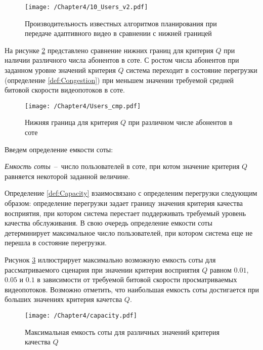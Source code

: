 \begin{figure}[htbp]
\begin{center}
\texttt{[image: /Chapter4/10\_Users\_v2.pdf]}
\caption{Производительность известных алгоритмов планирования при передаче адаптивного видео в сравнении с нижней границей}
\label{fig:Q_PLOT}
\end{center}
\end{figure}

На рисунке \ref{fig:Users_cmp} представлено сравнение нижних границ для критерия $Q$ при наличии различного числа абонентов в соте. С ростом числа абонентов при заданном уровне значений критерия $Q$ система переходит в состояние перегрузки (определение \ref{def:Congestion}) при меньшем значении требуемой средней битовой скорости видеопотоков в соте.

\begin{figure}[htbp]
\begin{center}
\texttt{[image: /Chapter4/Users\_cmp.pdf]}
\caption{Нижняя граница для критерия $Q$ при различном числе абонентов в соте}
\label{fig:Users_cmp}
\end{center}
\end{figure}

Введем определение емкости соты:
\begin{definition}
\label{def:Capacity}
    \emph{Емкость соты}~--~число пользователей в соте, при котом значение критерия $Q$ равняется некоторой заданной величине.
\end{definition}
Определение \ref{def:Capacity} взаимосвязано с определеним перегрузки следующим образом: определение перегрузки задает границу значения критерия качества восприятия, при котором система перестает поддерживать требуемый уровень качества обслуживания. В свою очередь определение емкости соты детерминирует максимальное число пользователей, при котором система еще не перешла в состояние перегрузки.

Рисунок \ref{fig:capacity} иллюстрирует максимально возможную емкость соты для рассматриваемого сценария при значении критерия восприятия $Q$ равном $0.01$, $0.05$ и $0.1$ в зависимости от требуемой битовой скорости просматриваемых видеопотоков. Возможно отметить, что наибольшая емкость соты достигается при больших значениях критерия качетсва $Q$.

\begin{figure}[htbp]
\begin{center}
\texttt{[image: /Chapter4/capacity.pdf]}
\caption{Максимальная емкость соты для различных значений критерия качества $Q$}
\label{fig:capacity}
\end{center}
\end{figure}

